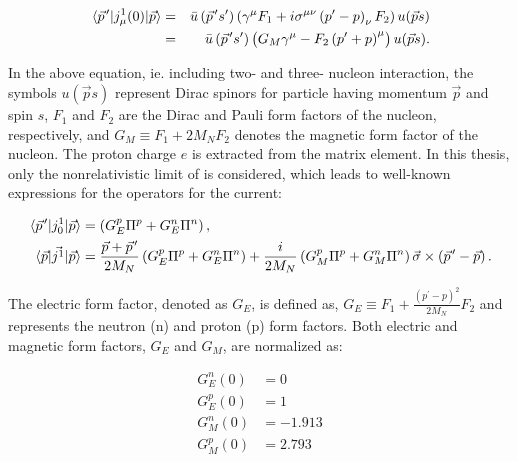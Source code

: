     \begin{equation}
        \begin{aligned}
        \matrixel{\pvec{p}} {j^1_\mu(0)} {\vec{p}} & =& \bar{u}\left(\pvec{p} s^{\prime}\right)\left(\gamma^\mu F_1+i \sigma^{\mu \nu}\left(p^{\prime}-p\right)_\nu F_2\right) u(\vec{p} s) \\
        & =&\bar{u}\left(\pvec{p} s^{\prime}\right)\left(G_M \gamma^\mu-F_2\left(p^{\prime}+p\right)^\mu\right) u(\vec{p} s) .
        \end{aligned}
        \label{current_general}       
    \end{equation}
    
    In the above equation,
    ie. including two- and three- nucleon interaction, the symbols $u(\vec{p} s)$ represent Dirac spinors
    for particle having momentum $\vec{p}$ and spin $s$, 
    $F_1$ and $F_2$ are the Dirac and Pauli form factors of the nucleon, respectively, and $G_M \equiv F_1+2 M_N F_2$ denotes the magnetic form factor of the nucleon. The proton charge $e$ is extracted from the matrix element. In this thesis, only the nonrelativistic limit of  is considered, which leads to well-known expressions for the operators for the current:


    \begin{align}
            \matrixel*{\pvec{p}} {j^1_0} {\vec{p}} &=\left(G_E^p \Pi^p+G_E^n \Pi^n\right), \\
            \matrixel{\vec{p}} {\vec{j^1}} {\vec{p}} &=\frac{\vec{p}+\pvec{p}}{2 M_N}\left(G_E^p \Pi^p+G_E^n \Pi^n\right)+\frac{i}{2 M_N}\left(G_M^p \Pi^p+G_M^n \Pi^n\right) \vec{\sigma} \times\left(\pvec{p}-\vec{p}\right) .
        \label{snc_formfact}
    \end{align}

    The electric form factor, denoted as $G_E$, is defined as,
    $G_E \equiv F_1+\frac{\left(p^{\prime}-p\right)^2}{2 M_N} F_2$ and 
    represents the neutron (n) and proton (p) form factors.
    Both electric and magnetic form factors, $G_E$ and $G_M$, are normalized as:

    \begin{equation}
        \begin{aligned}
        G_E^n(0) & =0 \\
        G_E^p(0) & =1 \\
        G_M^n(0) & =-1.913 \\
        G_M^p(0) & =2.793
        \end{aligned}
    \end{equation}

